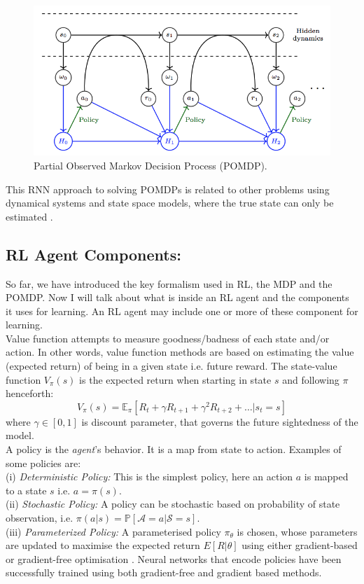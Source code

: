 \begin{figure}[t]
	\includegraphics[width=0.9\linewidth ]{fig/pomdp.png}
    \vspace{-2mm}
    \caption{Partial Observed Markov Decision Process (POMDP).}
    \label{fig:pomdp}
\end{figure}

This RNN approach to solving
POMDPs is related to other problems using dynamical systems
and state space models, where the true state can only be
estimated \cite{bertsekas2005dynamic}.


\subsection*{RL Agent Components:}
So far, we have introduced the key formalism used in RL,
the MDP and the POMDP. Now I will talk about what is inside an RL agent and the components it uses for learning. An RL agent may include one or more of these component for learning.\\
Value function attempts to measure goodness/badness of each state and/or action.
In other words, value function methods are based on estimating the value
(expected return) of being in a given state i.e. future reward.
The state-value
function $V_{\pi}(s)$
 is the expected return when starting in state $s$
and following $\pi$ henceforth:
$$V_{\pi}(s) = \mathbb{E}_\pi [R_t +\gamma R_{t+1} + \gamma^2 R_{t+2}+\ldots  | s_t =s ]$$
where $\gamma \in [0,1]$ is discount parameter, that governs the future sightedness of the model.
\\
  A policy is the {\em agent}'s behavior. It is a map from state to action. Examples of some policies are: \\
(i) {\em Deterministic Policy:} This is the simplest policy, here an action $a$ is mapped to a state $s$ i.e. $a = \pi(s)$.\\
(ii) {\em Stochastic Policy:} A policy can be stochastic based on probability of state observation, i.e. $\pi(a|s) = \mathbb{P}[\mathcal{A}=a |  \mathcal{S} = s]$.\\
(iii) {\em Parameterized Policy:} A parameterised policy $\pi_\theta$ is chosen, whose
parameters are updated to maximise the expected return $E[R|\theta]$ using either gradient-based or gradient-free optimisation \cite{deisenroth2013survey}. Neural networks that encode policies have been successfully
trained using both gradient-free \cite{gomez2005evolving, cuccu2011intrinsically, koutnik2013evolving} and gradient based \cite{williams1992simple, lillicrap2015continuous, heess2015learning} methods.

